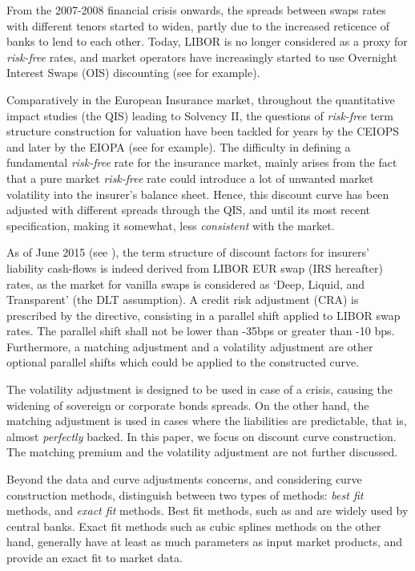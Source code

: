 \medskip

From the 2007-2008 financial crisis onwards, the spreads between swaps rates with different tenors started to widen, partly due to the increased reticence of banks to lend to each other. Today, LIBOR is no longer considered as a proxy for {\it risk-free} rates, and market operators have increasingly started to use Overnight Interest Swaps (OIS) discounting (see \cite{hull2012fva} for example).

\medskip

Comparatively in the European Insurance market, throughout the quantitative impact studies (the QIS) leading to Solvency II, the questions of {\it risk-free}  term structure construction for valuation have been tackled for years by the CEIOPS and later by the EIOPA (see \cite{CFOForum2010} for example). The difficulty in defining a fundamental {\it risk-free} rate for the insurance market, mainly arises from the fact that a pure market {\it risk-free} rate could introduce a lot of unwanted market volatility into the insurer’s balance sheet. Hence, this discount curve has been adjusted with different spreads through the QIS, and until its most recent specification, making it somewhat, less \textit{consistent} with the market.

\medskip

As of June 2015 (see \cite{EIOPA2015}), the term structure of discount factors for insurers’ liability cash-flows is indeed derived from LIBOR EUR swap (IRS hereafter) rates, as the market for vanilla swaps is considered as ‘Deep, Liquid, and Transparent’ (the DLT assumption). A credit risk adjustment (CRA) is prescribed by the directive, consisting in a parallel shift applied to LIBOR swap rates. The parallel shift shall not be lower than -35bps or greater than -10 bps. Furthermore, a matching adjustment and a volatility adjustment are other optional parallel shifts which could be applied to the constructed curve.

\medskip

The volatility adjustment is designed to be used in case of a crisis, causing the widening of sovereign or  corporate bonds spreads. On the other hand, the matching adjustment is used in cases where the liabilities are predictable, that is, almost \textit{perfectly} backed. In this paper, we focus  on discount curve construction. The matching premium and the volatility adjustment are not further discussed.

\medskip

Beyond the data and curve adjustments concerns, and considering curve construction methods, \cite{ametrano2013everything} distinguish between two types of methods: {\it best fit} methods, and {\it exact fit} methods. Best fit methods, such as \cite{nelson1987parsimonious} and \cite{svensson1994estimating} are widely used by central banks. Exact fit methods such as cubic splines methods on the other hand, generally have at least as much parameters as input market products, and provide an exact fit to market data.


